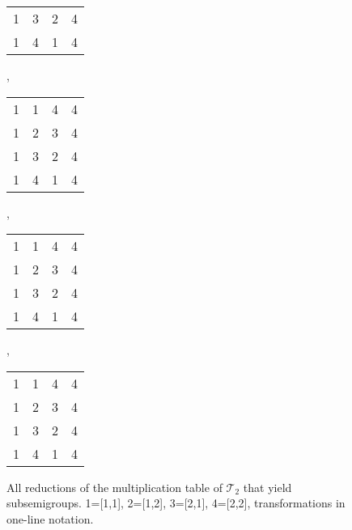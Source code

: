 \documentclass{amsart}
\newcommand{\cT}{{\mathcal T}}
\theoremstyle{plain}
\theoremstyle{definition}
\begin{document}
\begin{figure}
\begin{center}
\begin{tabular}{@{}c@{}c@{}c@{}c@{}}
\color{lgr}1&\color{lgr}3&\color{lgr}2&\color{lgr}4\\
1&\color{lgr}4&\color{lgr}1&4\\
\end{tabular},\ \ \ 
\begin{tabular}{@{}c@{}c@{}c@{}c@{}}
1&\color{lgr}1&\color{lgr}4&\color{lgr}4\\
\color{lgr}1&\color{lgr}2&\color{lgr}3&\color{lgr}4\\
\color{lgr}1&\color{lgr}3&\color{lgr}2&\color{lgr}4\\
\color{lgr}1&\color{lgr}4&\color{lgr}1&\color{lgr}4\\
\end{tabular},\ \ \ 
\begin{tabular}{@{}c@{}c@{}c@{}c@{}}
\color{lgr}1&\color{lgr}1&\color{lgr}4&\color{lgr}4\\
\color{lgr}1&2&3&\color{lgr}4\\
\color{lgr}1&3&2&\color{lgr}4\\
\color{lgr}1&\color{lgr}4&\color{lgr}1&\color{lgr}4\\
\end{tabular},\ \ \ 
\begin{tabular}{@{}c@{}c@{}c@{}c@{}}
\color{lgr}1&\color{lgr}1&\color{lgr}4&\color{lgr}4\\
\color{lgr}1&2&\color{lgr}3&\color{lgr}4\\
\color{lgr}1&\color{lgr}3&\color{lgr}2&\color{lgr}4\\
\color{lgr}1&\color{lgr}4&\color{lgr}1&\color{lgr}4\\
\end{tabular}
\end{center}
\caption{All reductions of the multiplication table of $\cT_2$ that yield subsemigroups.  1=[1,1], 2=[1,2], 3=[2,1], 4=[2,2], transformations in one-line notation.}
\end{figure}
\end{document}
